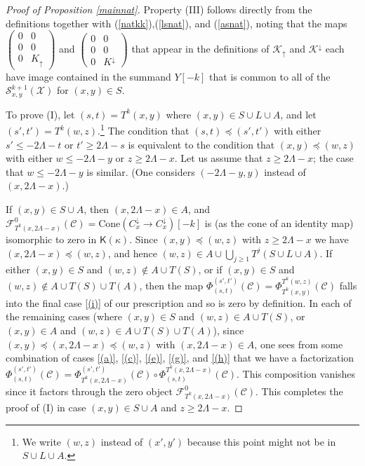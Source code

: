 \documentclass[11pt]{amsart}
\theoremstyle{definition}
\theoremstyle{remark}
\numberwithin{equation}{section}
\begin{document}
\begin{proof}[Proof of Proposition \ref{mainnat}]
	Property (III) follows directly from the definitions together with (\ref{natkk}),(\ref{lsnat}), and (\ref{asnat}), noting that the maps $\left(\begin{array}{cc} 0 & 0\\ 0 & 0 \\ 0 & K_{\uparrow}\end{array}\right)$ and 
$\left(\begin{array}{cc} 0 & 0\\ 0 & 0 \\ 0 & K^{\downarrow}\end{array}\right)$ that appear in the definitions of $\mathcal{K}_{\uparrow}$ and $\mathcal{K}^{\downarrow}$ each have image contained in the summand $Y[-k]$ that is common to all of the $\mathcal{S}^{k+1}_{x,y}(\mathcal{X})$ for $(x,y)\in S$.

To prove (I), let $(s,t)=T^k(x,y)$ where $(x,y)\in S\cup L\cup A$, and let $(s',t')=T^k(w,z)$.\footnote{We write $(w,z)$ instead of $(x',y')$ because this point might not be in $S\cup L\cup A$.}  The condition that $(s,t)\preceq (s',t')$ with either $s'\leq -2\Lambda-t$ or $t'\geq 2\Lambda-s$ is equivalent to the condition that $(x,y)\preceq (w,z)$ with either $w\leq -2\Lambda-y$ or $z\geq 2\Lambda-x$.  Let us assume that $z\geq 2\Lambda-x$; the case that $w\leq -2\Lambda-y$ is similar. (One considers $(-2\Lambda-y,y)$ instead of $(x,2\Lambda-x)$.)

If $(x,y)\in S\cup A$, then $(x,2\Lambda-x)\in A$, and $\mathcal{F}^{0}_{T^k(x,2\Lambda-x)}(\mathcal{C})=\mathrm{Cone}(C^{\downarrow}_{x}\to C^{\downarrow}_{x})[-k]$ is (as the  cone of an identity map) isomorphic to zero in $\mathsf{K}(\kappa)$.  Since $ (x,y)\preceq (w,z)$ with $z\geq 2\Lambda-x$ we have $(x,2\Lambda-x)\preceq (w,z)$, and hence $(w,z)\in A\cup\bigcup_{j\geq 1}T^j(S\cup L\cup A)$.  If either $(x,y)\in S$ and $(w,z)\notin A\cup T(S)$, or if $(x,y)\in S$ and $(w,z)\notin A\cup T(S)\cup T(A)$, then the map $\Phi_{(s,t)}^{(s',t')}(\mathcal{C})=\Phi_{T^k(x,y)}^{T^k(w,z)}(\mathcal{C})$ falls into the final case \ref{(i)} of our prescription and so is zero by definition.  In each of the remaining cases (where $(x,y)\in S$ and $(w,z)\in A\cup T(S)$, or $(x,y)\in A$ and $(w,z)\in A\cup T(S)\cup T(A)$), since $(x,y)\preceq (x,2\Lambda-x)\preceq (w,z)$ with $(x,2\Lambda-x)\in A$, one sees from some combination of cases \ref{(a)}, \ref{(c)}, \ref{(e)}, \ref{(g)}, and \ref{(h)} that we have a factorization $\Phi_{(s,t)}^{(s',t')}(\mathcal{C})=\Phi_{T^k(x,2\Lambda-x)}^{(s',t')}(\mathcal{C})\circ \Phi_{(s,t)}^{T^k(x,2\Lambda-x)}(\mathcal{C})$.  This composition vanishes since it factors through the zero object $\mathcal{F}^{0}_{T^k(x,2\Lambda-x)}(\mathcal{C})$.  This completes the proof of (I) in case $(x,y)\in S\cup A$ and $z\geq 2\Lambda-x$.
	

\end{proof}
\end{document}
